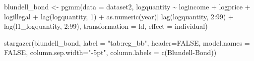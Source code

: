 \documentclass[
]{article}
\newenvironment{Shaded}{\begin{snugshade}}{\end{snugshade}}
\newcommand{\AttributeTok}[1]{\textcolor[rgb]{0.77,0.63,0.00}{#1}}
\newcommand{\ConstantTok}[1]{\textcolor[rgb]{0.00,0.00,0.00}{#1}}
\newcommand{\DecValTok}[1]{\textcolor[rgb]{0.00,0.00,0.81}{#1}}
\newcommand{\FunctionTok}[1]{\textcolor[rgb]{0.00,0.00,0.00}{#1}}
\newcommand{\NormalTok}[1]{#1}
\newcommand{\OtherTok}[1]{\textcolor[rgb]{0.56,0.35,0.01}{#1}}
\newcommand{\SpecialCharTok}[1]{\textcolor[rgb]{0.00,0.00,0.00}{#1}}
\newcommand{\StringTok}[1]{\textcolor[rgb]{0.31,0.60,0.02}{#1}}
\let\oldShaded\Shaded
\let\endoldShaded\endShaded
\renewenvironment{Shaded}{\footnotesize\oldShaded}{\endoldShaded}
\begin{document}
\begin{Shaded}
\begin{Highlighting}[]
\NormalTok{blundell\_bond }\OtherTok{\textless{}{-}} \FunctionTok{pgmm}\NormalTok{(}\AttributeTok{data =}\NormalTok{ dataset2,}
\NormalTok{                          logquantity }\SpecialCharTok{\textasciitilde{}}\NormalTok{ logincome }\SpecialCharTok{+}\NormalTok{ logprice }\SpecialCharTok{+} 
\NormalTok{                            logillegal }\SpecialCharTok{+} \FunctionTok{lag}\NormalTok{(logquantity, }\DecValTok{1}\NormalTok{) }\SpecialCharTok{+} \FunctionTok{as.numeric}\NormalTok{(year)}\SpecialCharTok{|} 
                            \FunctionTok{lag}\NormalTok{(logquantity, }\DecValTok{2}\SpecialCharTok{:}\DecValTok{99}\NormalTok{) }\SpecialCharTok{+} \FunctionTok{lag}\NormalTok{(l1\_logquantity, }\DecValTok{2}\SpecialCharTok{:}\DecValTok{99}\NormalTok{), }\AttributeTok{transformation =} \StringTok{\textquotesingle{}ld\textquotesingle{}}\NormalTok{, }
                            \AttributeTok{effect =} \StringTok{\textquotesingle{}individual\textquotesingle{}}\NormalTok{)}

\FunctionTok{stargazer}\NormalTok{(blundell\_bond, }\AttributeTok{label =} \StringTok{"tab:reg\_bb"}\NormalTok{, }\AttributeTok{header=}\ConstantTok{FALSE}\NormalTok{, }\AttributeTok{model.names =} \ConstantTok{FALSE}\NormalTok{,}
          \AttributeTok{column.sep.width=}\StringTok{"{-}5pt"}\NormalTok{,}
          \AttributeTok{column.labels =} \FunctionTok{c}\NormalTok{(}\StringTok{\textquotesingle{}Blundell{-}Bond\textquotesingle{}}\NormalTok{))}
\end{Highlighting}
\end{Shaded}
\end{document}
